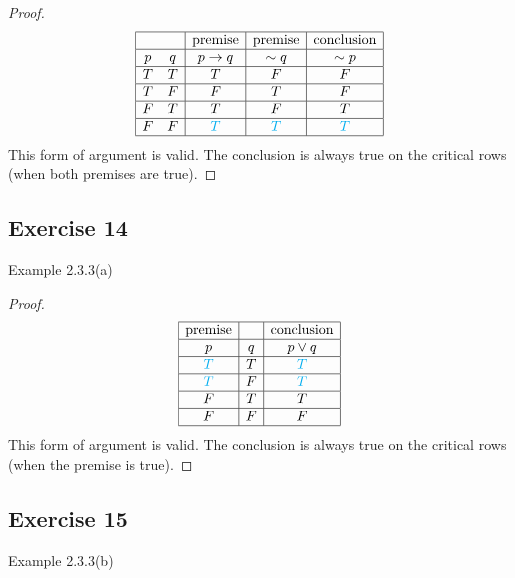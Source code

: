 \documentclass[14pt]{extarticle}
\begin{document}
\begin{proof} $$ \begin{array}{|cc|c|c|c|}
            \hline
              &   & \text{premise} & \text{premise} & \text{conclusion} \\ \hline p & q & p \to q & {\sim q} & {\sim p} \\
            \hline
            T & T & T              & F              & F                 \\
            \hline
            T & F & F              & T              & F                 \\
            \hline
            F & T & T              & F              & T                 \\
            \hline
            F & F & \color{cyan} T & \color{cyan} T & \color{cyan} T    \\
            \hline
        \end{array}
    $$
    This form of argument is valid. The conclusion is always true on the critical rows (when both premises are true).
\end{proof}

\subsection{Exercise 14}
Example 2.3.3(a)

\begin{proof}
    $$
        \begin{array}{|c|c|c|}
            \hline
            \text{premise} &   & \text{conclusion} \\
            \hline
            p              & q & p \vee q          \\
            \hline
            \color{cyan} T & T & \color{cyan} T    \\
            \hline
            \color{cyan} T & F & \color{cyan} T    \\
            \hline
            F              & T & T                 \\
            \hline
            F              & F & F                 \\
            \hline
        \end{array}
    $$
    This form of argument is valid. The conclusion is always true on the critical rows (when the premise is true).
\end{proof}

\subsection{Exercise 15}
Example 2.3.3(b)
\end{document}
